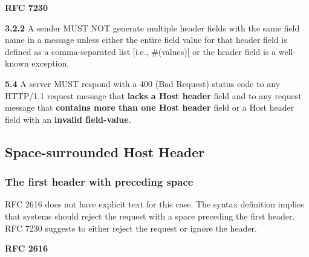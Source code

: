 \textbf{RFC 7230}
\columnseprule=1pt    %
\begin{multicols}{2}
	\begin{spacing}{0.8}
	\textbf{3.2.2}
	{\footnotesize A sender MUST NOT generate multiple header fields with the same field name in a message unless either the entire field value for that header field is defined as a comma-separated list [i.e., \#(values)] or the header field is a well-known exception.}
	
	\textbf{5.4}
	{\footnotesize A server MUST respond with a 400 (Bad Request) status code to any HTTP/1.1 request message that \textbf{lacks a Host header} field and to any request message that \textbf{contains more than one Host header} field or a Host header field with an \textbf{invalid field-value}.}
	\end{spacing}
\end{multicols}

\subsection{Space-surrounded Host Header}
\subsubsection{The first header with preceding space}
RFC 2616 does not have explicit text for this case. The syntax definition implies that systems should reject the request with a space preceding the first header. RFC 7230 suggests to either reject the request or ignore the header.

\textbf{RFC 2616}
\columnseprule=1pt    %
\begin{multicols}{2}
	\begin{spacing}{0.8}
		\textbf{} 
		{\footnotesize  }
	\end{spacing}
\end{multicols}

